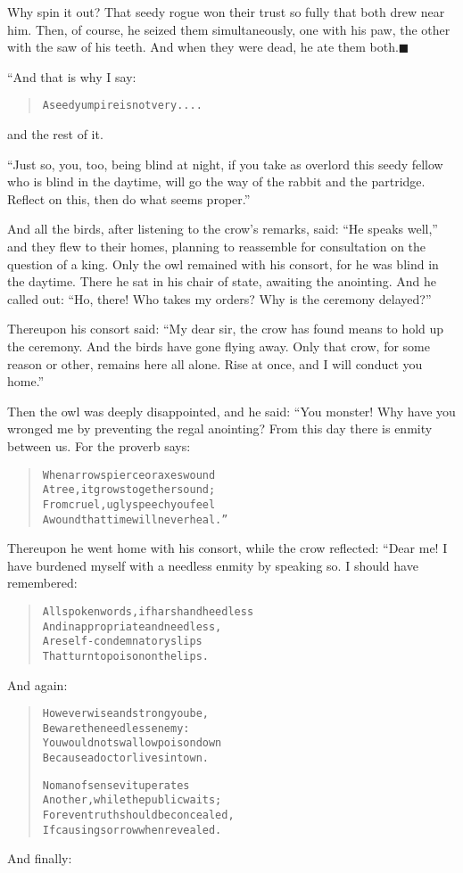 \documentclass[article, twoside, 14pt]{memoir}
\newcommand{\qed}{\hfill \ensuremath{\blacksquare}}
\renewenvironment{verbatim}{%
\begin{quote}%
\vskip -10pt%
\begin{alltt}\normalfont\large}{\end{alltt}%
\end{quote}%
\vskip -10pt
} %
\begin{document}
Why spin it out? That seedy rogue won their trust so fully that
both drew near him. Then, of course, he seized them simultaneously,
one with his paw, the other with the saw of his teeth. And when
they were dead, he ate them both.\hyperref[s50]{\qed}

“And that is why I say:

\begin{verbatim}
A seedy umpire is not very. . . .
\end{verbatim}
and the rest of it.

``Just so, you, too, being blind at night, if you take as overlord this seedy fellow who is blind in the daytime, will go the way of the rabbit and the partridge. Reflect on this, then do what seems proper.''

And all the birds, after listening to the crow's remarks, said:
``He speaks well,'' and they flew to their homes, planning to
reassemble for consultation on the question of a king. Only the owl
remained with his consort, for he was blind in the daytime. There
he sat in his chair of state, awaiting the anointing. And he called
out:
``Ho, there! Who takes my orders? Why is the ceremony delayed?''

Thereupon his consort said:
``My dear sir, the crow has found means to hold up the ceremony. And the birds have gone flying away. Only that crow, for some reason or other, remains here all alone. Rise at once, and I will conduct you home.''

Then the owl was deeply disappointed, and he said: “You monster!
Why have you wronged me by preventing the regal anointing? From
this day there is enmity between us. For the proverb says:

\begin{verbatim}
When arrows pierce or axes wound
A tree, it grows together sound;
From cruel, ugly speech you feel
A wound that time will never heal.”
\end{verbatim}
Thereupon he went home with his consort, while the crow
reflected: “Dear me! I have burdened myself with a needless enmity
by speaking so. I should have remembered:

\begin{verbatim}
All spoken words, if harsh and heedless
And inappropriate and needless,
Are self-condemnatory slips
That turn to poison on the lips.
\end{verbatim}
And again:

\begin{verbatim}
However wise and strong you be,
Beware the needless enemy:
You would not swallow poison down
Because a doctor lives in town.

No man of sense vituperates
Another, while the public waits;
For even truth should be concealed,
If causing sorrow when revealed.
\end{verbatim}
And finally:
\end{document}
